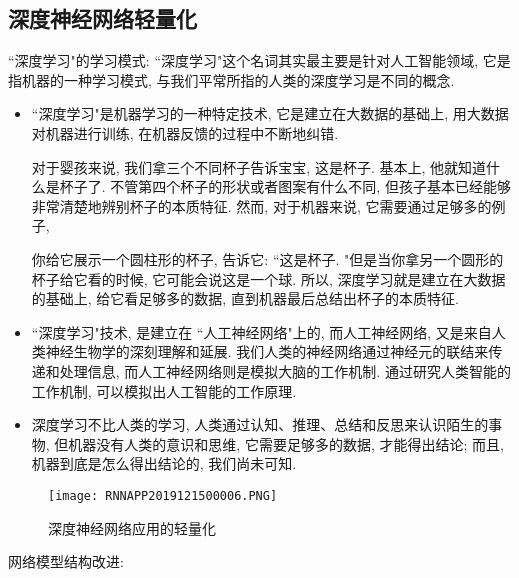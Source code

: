 \subsection{深度神经网络轻量化}
 ``深度学习"的学习模式:  ``深度学习"这个名词其实最主要是针对人工智能领域, 它是指机器的一种学习模式, 与我们平常所指的人类的深度学习是不同的概念.
\begin{itemize}
    \item  ``深度学习"是机器学习的一种特定技术, 它是建立在大数据的基础上, 用大数据对机器进行训练, 在机器反馈的过程中不断地纠错.
    \begin{example}
    对于婴孩来说, 我们拿三个不同杯子告诉宝宝, 这是杯子.
    基本上, 他就知道什么是杯子了. 不管第四个杯子的形状或者图案有什么不同, 但孩子基本已经能够非常清楚地辨别杯子的本质特征.
    然而, 对于机器来说, 它需要通过足够多的例子,
    \end{example}
    \begin{example}
    你给它展示一个圆柱形的杯子, 告诉它:  ``这是杯子. "但是当你拿另一个圆形的杯子给它看的时候, 它可能会说这是一个球.
    所以, 深度学习就是建立在大数据的基础上, 给它看足够多的数据, 直到机器最后总结出杯子的本质特征.
    \end{example}
    \item  ``深度学习"技术, 是建立在 ``人工神经网络"上的, 而人工神经网络, 又是来自人类神经生物学的深刻理解和延展.
    我们人类的神经网络通过神经元的联结来传递和处理信息, 而人工神经网络则是模拟大脑的工作机制.
    通过研究人类智能的工作机制, 可以模拟出人工智能的工作原理.

    \item 深度学习不比人类的学习, 人类通过认知、推理、总结和反思来认识陌生的事物, 但机器没有人类的意识和思维, 它需要足够多的数据, 才能得出结论; 而且, 机器到底是怎么得出结论的, 我们尚未可知.
\end{itemize}
\begin{figure}[H]
\centering
\texttt{[image: RNNAPP2019121500006.PNG]}
\caption{深度神经网络应用的轻量化}
\label{RNNAPP2019121500006}\vspace{-0.4cm}
\end{figure}

网络模型结构改进:

